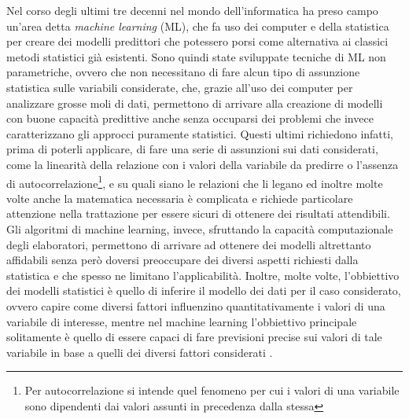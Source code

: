 \documentclass[a4paper]{report}
\begin{document}
Nel corso degli ultimi tre decenni nel mondo dell'informatica ha preso campo un'area detta \textit{machine learning} (ML), che fa uso dei computer e della statistica per creare dei modelli predittori che potessero porsi come alternativa ai classici metodi statistici già esistenti. Sono quindi state sviluppate tecniche di ML non parametriche, ovvero che non necessitano di fare alcun tipo di assunzione statistica sulle variabili considerate, che, grazie all'uso dei computer per analizzare grosse moli di dati, permettono di arrivare alla creazione di modelli con buone capacità predittive anche senza occuparsi dei problemi che invece caratterizzano gli approcci puramente statistici. Questi ultimi richiedono infatti, prima di poterli applicare, di fare una serie di assunzioni
sui dati considerati, come la linearità della relazione con i valori della variabile da predirre o l'assenza di autocorrelazione\footnote{Per autocorrelazione si intende quel fenomeno per cui i valori di una variabile sono dipendenti dai valori assunti in precedenza dalla stessa}, e su quali siano le relazioni che li legano ed inoltre molte volte anche la matematica necessaria è complicata e richiede particolare attenzione nella trattazione per essere sicuri di ottenere dei risultati attendibili. Gli algoritmi di machine learning, invece, sfruttando la capacità computazionale degli elaboratori, permettono di arrivare ad ottenere dei modelli altrettanto affidabili senza però doversi preoccupare dei diversi aspetti richiesti dalla statistica e che spesso ne limitano l'applicabilità. Inoltre, molte volte, l'obbiettivo dei modelli statistici è quello di inferire il modello dei dati per il caso considerato, ovvero capire come diversi fattori influenzino quantitativamente i valori di una variabile di interesse, mentre nel machine learning l'obbiettivo principale solitamente è quello di essere capaci di fare previsioni precise sui valori di tale variabile in base a quelli dei diversi fattori considerati \cite{breiman2003statistical}. 
\end{document}
